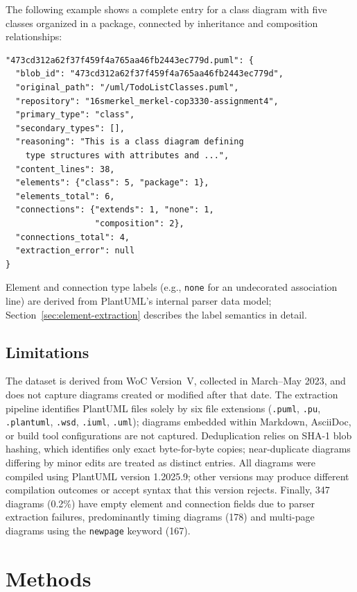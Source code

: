 \documentclass[data,datadescriptor,submit,pdftex,moreauthors]{Definitions/mdpi}
\begin{document}
\noindent The following example shows a complete entry for a class diagram with five classes organized in a package, connected by inheritance and composition relationships:

\begin{verbatim}
"473cd312a62f37f459f4a765aa46fb2443ec779d.puml": {
  "blob_id": "473cd312a62f37f459f4a765aa46fb2443ec779d",
  "original_path": "/uml/TodoListClasses.puml",
  "repository": "16smerkel_merkel-cop3330-assignment4",
  "primary_type": "class",
  "secondary_types": [],
  "reasoning": "This is a class diagram defining
    type structures with attributes and ...",
  "content_lines": 38,
  "elements": {"class": 5, "package": 1},
  "elements_total": 6,
  "connections": {"extends": 1, "none": 1,
                  "composition": 2},
  "connections_total": 4,
  "extraction_error": null
}
\end{verbatim}

\noindent Element and connection type labels (e.g., \texttt{none} for an undecorated association line) are derived from PlantUML's internal parser data model; Section~\ref{sec:element-extraction} describes the label semantics in detail.

\subsection{Limitations}
\label{sec:limitations}

The dataset is derived from WoC Version~V, collected in March--May 2023, and does not capture diagrams created or modified after that date. The extraction pipeline identifies PlantUML files solely by six file extensions (\texttt{.puml}, \texttt{.pu}, \texttt{.plantuml}, \texttt{.wsd}, \texttt{.iuml}, \texttt{.uml}); diagrams embedded within Markdown, AsciiDoc, or build tool configurations are not captured. Deduplication relies on SHA-1 blob hashing, which identifies only exact byte-for-byte copies; near-duplicate diagrams differing by minor edits are treated as distinct entries. All diagrams were compiled using PlantUML version 1.2025.9; other versions may produce different compilation outcomes or accept syntax that this version rejects. Finally, 347 diagrams (0.2\%) have empty element and connection fields due to parser extraction failures, predominantly timing diagrams (178) and multi-page diagrams using the \texttt{newpage} keyword (167).


\section{Methods}
\label{sec:methods}
\end{document}
